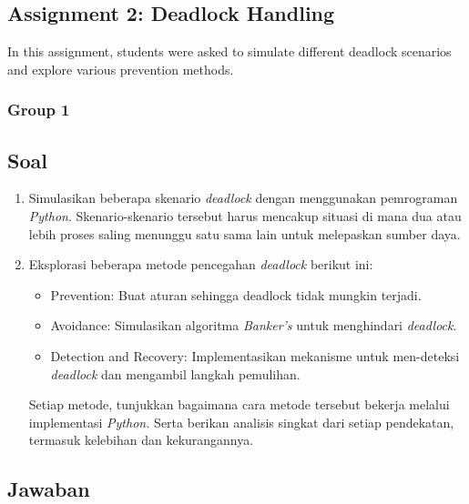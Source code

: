 \documentclass[12pt]{article}
\begin{document}
\subsection{Assignment 2: Deadlock Handling}
In this assignment, students were asked to simulate different deadlock scenarios and explore various prevention methods.

\subsubsection{Group 1}
\subsection*{Soal}

\begin{enumerate}
    \item Simulasikan beberapa skenario \textit{deadlock} dengan menggunakan pemrograman \textit{Python}. Skenario-skenario tersebut harus mencakup situasi di mana dua atau lebih proses saling menunggu satu sama lain untuk melepaskan sumber daya.

    \item Eksplorasi beberapa metode pencegahan \textit{deadlock} berikut ini:
    \begin{itemize}
        \item  {Prevention}: Buat aturan sehingga deadlock tidak mungkin terjadi.
        \item {Avoidance}: Simulasikan algoritma \textit{Banker's} untuk menghindari \textit{deadlock}.
        \item {Detection and Recovery}: Implementasikan mekanisme untuk men-deteksi \textit{deadlock} dan mengambil langkah pemulihan.
    \end{itemize}
    Setiap metode, tunjukkan bagaimana cara metode tersebut bekerja melalui implementasi \textit{Python.} Serta berikan analisis singkat dari setiap pendekatan, termasuk kelebihan dan kekurangannya.
\end{enumerate}

\subsection*{Jawaban}
\end{document}
